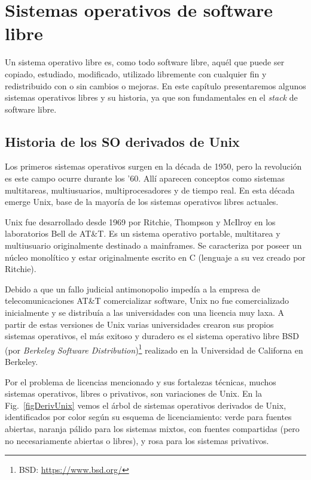 \chapter{Sistemas operativos de software libre}

Un sistema operativo libre es, como todo software libre, aquél que puede ser copiado, estudiado, modificado, utilizado libremente con cualquier fin y redistribuido con o sin cambios o mejoras.
En este capítulo presentaremos algunos sistemas operativos libres y su historia, ya que son fundamentales en el \emph{stack} de software libre.

\section{Historia de los SO derivados de Unix}

Los primeros sistemas operativos surgen en la década de 1950, pero la revolución es este campo ocurre durante los '60. Allí aparecen conceptos como sistemas multitareas, multiusuarios, multiprocesadores y de tiempo real. En esta década emerge Unix, base de la mayoría de los sistemas operativos libres actuales.

Unix fue desarrollado desde 1969 por Ritchie, Thompson y McIlroy en los laboratorios Bell de AT\&T. Es un sistema operativo portable, multitarea y multiusuario originalmente destinado a mainframes. Se caracteriza por poseer un núcleo monolítico y estar originalmente escrito en C (lenguaje a su vez creado por Ritchie).

Debido a que un fallo judicial antimonopolio impedía a la empresa de telecomunicaciones AT\&T comercializar software, Unix no fue comercializado inicialmente y se distribuía a las universidades con una licencia muy laxa. A partir de estas versiones de Unix varias universidades crearon sus propios sistemas operativos, el más exitoso y duradero es el sistema operativo libre BSD (por \emph{Berkeley Software Distribution})\footnote{BSD: \url{https://www.bsd.org/}} realizado en la Universidad de Californa en Berkeley. 

Por el problema de licencias mencionado y sus fortalezas técnicas, muchos sistemas operativos, libres o privativos, son variaciones de Unix. En la Fig.~\ref{figDerivUnix} vemos el árbol de sistemas operativos derivados de Unix, identificados por color según su esquema de licenciamiento: verde para fuentes abiertas, naranja pálido para los sistemas mixtos, con fuentes compartidas (pero no necesariamente abiertas o libres), y rosa para los sistemas privativos.

